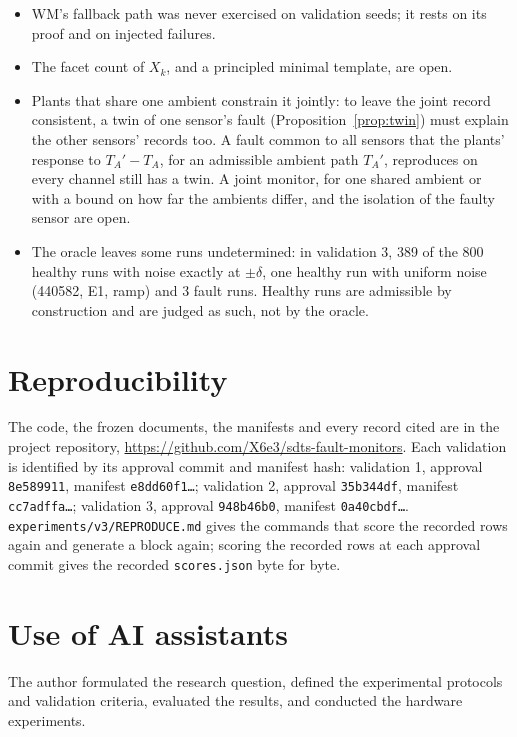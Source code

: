 \documentclass[11pt,a4paper]{article}
\begin{document}
\begin{itemize}
\item WM's fallback path was never exercised on validation seeds; it rests on its proof and on injected failures.
\item The facet count of $X_k$, and a principled minimal template, are open.
\item Plants that share one ambient constrain it jointly: to leave the joint record consistent, a twin of one
  sensor's fault (Proposition~\ref{prop:twin}) must explain the other sensors' records too. A fault common to all
  sensors that the plants' response to $T_A' - T_A$, for an admissible ambient path $T_A'$, reproduces on every
  channel still has a twin. A
  joint monitor, for one shared ambient or with a bound on how far the ambients differ, and the isolation of the
  faulty sensor are open.
\item The oracle leaves some runs undetermined: in validation 3, 389 of the 800 healthy runs with noise exactly at
  $\pm\delta$, one healthy run with uniform noise (440582, E1, ramp) and 3 fault runs. Healthy runs are admissible by
  construction and are judged as such, not by the oracle.
\end{itemize}

\section{Reproducibility}

The code, the frozen documents, the manifests and every record cited are in the project repository,
\url{https://github.com/X6e3/sdts-fault-monitors}. Each validation is identified by its approval commit and manifest hash: validation 1, approval
\texttt{8e589911}, manifest \texttt{e8dd60f1\dots}; validation 2, approval \texttt{35b344df}, manifest
\texttt{cc7adffa\dots}; validation 3, approval \texttt{948b46b0}, manifest \texttt{0a40cbdf\dots}.
\texttt{experiments/v3/REPRODUCE.md} gives the commands that score the recorded rows again and generate a block
again; scoring the recorded rows at each approval commit gives the recorded \texttt{scores.json} byte for byte.

\section*{Use of AI assistants}

The author formulated the research question, defined the experimental protocols and validation criteria, evaluated
the results, and conducted the hardware experiments.
\end{document}
